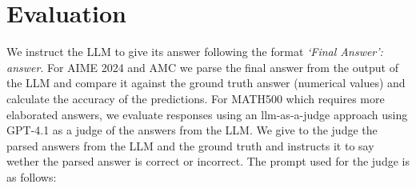 \section{Evaluation}

We instruct the LLM to give its answer following the format \textit{`Final Answer': answer}.
For AIME 2024 and AMC we parse the final answer from the output of the LLM and compare it against the ground truth answer (numerical values) and calculate the accuracy of the predictions.
For MATH500 which requires more elaborated answers, we evaluate responses using an llm-as-a-judge approach \citep{Zheng2023} using GPT-4.1 as a judge of the answers from the LLM.
We give to the judge the parsed answers from the LLM and the ground truth and instructs it to say wether the parsed answer is correct or incorrect.
The prompt used for the judge is as follows:

